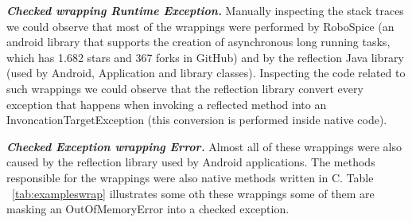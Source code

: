 \documentclass[conference]{IEEEtran}
\begin{document}
\emph{\textbf{Checked wrapping Runtime Exception.}} Manually inspecting the stack 
traces we could observe that most of the wrappings were performed 
by RoboSpice (an android library that supports the creation of asynchronous long running 
tasks, which has 1.682 stars and 367 forks in GitHub) and by the reflection Java library (used by Android, 
Application and library classes). Inspecting the code related to such wrappings we could observe that
the reflection library convert every exception that happens 
when invoking a reflected method into an InvoncationTargetException (this conversion is 
performed inside native code).



\emph{\textbf{Checked Exception wrapping Error.}} Almost all of these wrappings
 were also caused by the reflection library 
used by Android applications. The methods responsible for the wrappings
were also native methods written in C. Table ~\ref{tab:exampleswrap} illustrates
some oth these wrappings some of them are masking an OutOfMemoryError
into a checked exception.

\end{document}
